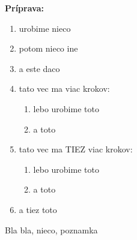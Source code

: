 \begin{recipe}
\textbf{ {\normalsize Príprava:} }
\begin{enumerate}

  \item{urobime nieco}
  \item{potom nieco ine}
  \item{a este daco}
  \item{tato vec ma viac krokov: }
      \begin{enumerate}
          \item{lebo urobime toto}
          \item{a toto}\end{enumerate}
  \item{tato vec ma TIEZ viac krokov: }
      \begin{enumerate}
          \item{lebo urobime toto}
          \item{a toto}\end{enumerate}
  \item{a tiez toto}

\end{enumerate}
\end{recipe}

\begin{notes}
  Bla bla, nieco, poznamka
\end{notes}	
\clearpage
